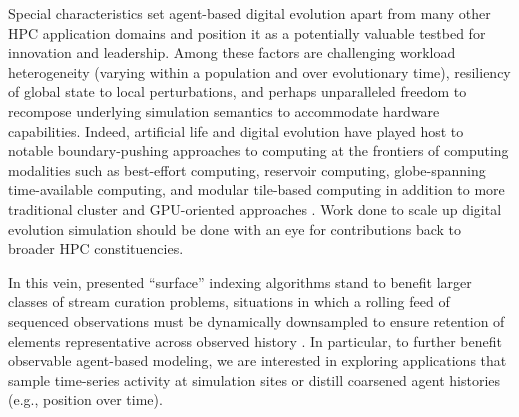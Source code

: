 Special characteristics set agent-based digital evolution apart from many other HPC application domains and position it as a potentially valuable testbed for innovation and leadership.
Among these factors are challenging workload heterogeneity (varying within a population and over evolutionary time), resiliency of global state to local perturbations, and perhaps unparalleled freedom to recompose underlying simulation semantics to accommodate hardware capabilities.
Indeed, artificial life and digital evolution have played host to notable boundary-pushing approaches to computing at the frontiers of computing modalities such as best-effort computing, reservoir computing, globe-spanning time-available computing, and modular tile-based computing in addition to more traditional cluster and GPU-oriented approaches \citep{moreno2021conduit,ackley2020best,ackley2023robust,heinemann2008artificial,miikkulainen2024evolving}.
Work done to scale up digital evolution simulation should be done with an eye for contributions back to broader HPC constituencies.



In this vein, presented ``surface'' indexing algorithms stand to benefit larger classes of stream curation problems, situations in which a rolling feed of sequenced observations must be dynamically downsampled to ensure retention of elements representative across observed history \citep{moreno2024algorithms}.
In particular, to further benefit observable agent-based modeling, we are interested in exploring applications that sample time-series activity at simulation sites or distill coarsened agent histories (e.g., position over time).

